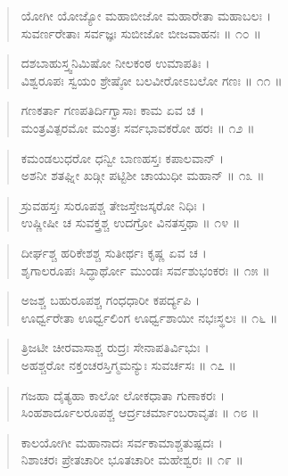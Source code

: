 \begin{verse}
ಯೋಗೀ ಯೋಜ್ಯೋ ಮಹಾಬೀಜೋ ಮಹಾರೇತಾ ಮಹಾಬಲಃ ।\\ಸುವರ್ಣರೇತಾಃ ಸರ್ವಜ್ಞಃ ಸುಬೀಜೋ ಬೀಜವಾಹನಃ \num{॥ ೧೦ ॥}
\end{verse}

\begin{verse}
ದಶಬಾಹುಸ್ತ್ವನಿಮಿಷೋ ನೀಲಕಂಠ ಉಮಾಪತಿಃ ।\\ವಿಶ್ವರೂಪಃ ಸ್ವಯಂ ಶ್ರೇಷ್ಠೋ ಬಲವೀರೋಽಬಲೋ ಗಣಃ \num{॥ ೧೧ ॥}
\end{verse}

\begin{verse}
ಗಣಕರ್ತಾ ಗಣಪತಿರ್ದಿಗ್ವಾಸಾಃ ಕಾಮ ಏವ ಚ ।\\ಮಂತ್ರವಿತ್ಪರಮೋ ಮಂತ್ರಃ ಸರ್ವಭಾವಕರೋ ಹರಃ \num{॥ ೧೨ ॥}
\end{verse}

\begin{verse}
ಕಮಂಡಲುಧರೋ ಧನ್ವೀ ಬಾಣಹಸ್ತಃ ಕಪಾಲವಾನ್ ।\\ಅಶನೀ ಶತಘ್ನೀ ಖಡ್ಗೀ ಪಟ್ಟಿಶೀ ಚಾಯುಧೀ ಮಹಾನ್ \num{॥ ೧೩ ॥}
\end{verse}

\begin{verse}
ಸ್ರುವಹಸ್ತಃ ಸುರೂಪಶ್ಚ ತೇಜಸ್ತೇಜಸ್ಕರೋ ನಿಧಿಃ ।\\ಉಷ್ಣೀಷೀ ಚ ಸುವಕ್ತ್ರಶ್ಚ ಉದಗ್ರೋ ವಿನತಸ್ತಥಾ \num{॥ ೧೪ ॥}
\end{verse}

\begin{verse}
ದೀರ್ಘಶ್ಚ ಹರಿಕೇಶಶ್ಚ ಸುತೀರ್ಥಃ ಕೃಷ್ಣ ಏವ ಚ ।\\ಶೃಗಾಲರೂಪಃ ಸಿದ್ಧಾರ್ಥೋ ಮುಂಡಃ ಸರ್ವಶುಭಂಕರಃ \num{॥ ೧೫ ॥}
\end{verse}

\begin{verse}
ಅಜಶ್ಚ ಬಹುರೂಪಶ್ಚ ಗಂಧಧಾರೀ ಕಪರ್ದ್ಯಪಿ ।\\ಊರ್ಧ್ವರೇತಾ ಊರ್ಧ್ವಲಿಂಗ ಊರ್ಧ್ವಶಾಯೀ ನಭಃಸ್ಥಲಃ \num{॥ ೧೬ ॥}
\end{verse}

\begin{verse}
ತ್ರಿಜಟೀ ಚೀರವಾಸಾಶ್ಚ ರುದ್ರಃ ಸೇನಾಪತಿರ್ವಿಭುಃ ।\\ಅಹಶ್ಚರೋ ನಕ್ತಂಚರಸ್ತಿಗ್ಮಮನ್ಯುಃ ಸುವರ್ಚಸಃ \num{॥ ೧೭ ॥}
\end{verse}

\begin{verse}
ಗಜಹಾ ದೈತ್ಯಹಾ ಕಾಲೋ ಲೋಕಧಾತಾ ಗುಣಾಕರಃ ।\\ಸಿಂಹಶಾರ್ದೂಲರೂಪಶ್ಚ ಆರ್ದ್ರಚರ್ಮಾಂಬರಾವೃತಃ \num{॥ ೧೮ ॥}
\end{verse}

\begin{verse}
ಕಾಲಯೋಗೀ ಮಹಾನಾದಃ ಸರ್ವಕಾಮಾಶ್ಚತುಷ್ಪದಃ ।\\ನಿಶಾಚರಃ ಪ್ರೇತಚಾರೀ ಭೂತಚಾರೀ ಮಹೇಶ್ವರಃ \num{॥ ೧೯ ॥}
\end{verse}

